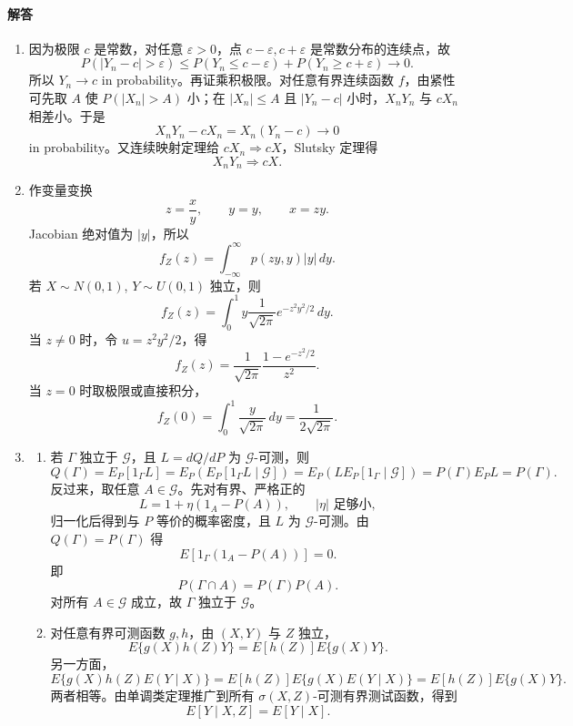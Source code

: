 \documentclass[UTF8,12pt]{ctexart}
\begin{document}
\paragraph{解答}
\begin{enumerate}[label=\textbf{\arabic*.},leftmargin=2.2em]
\item 因为极限 \(c\) 是常数，对任意 \(\varepsilon>0\)，点 \(c-\varepsilon,c+\varepsilon\) 是常数分布的连续点，故
\[
P(|Y_n-c|>\varepsilon)
\le P(Y_n\le c-\varepsilon)+P(Y_n\ge c+\varepsilon)\to0.
\]
所以 \(Y_n\to c\) in probability。再证乘积极限。对任意有界连续函数 \(f\)，由紧性可先取 \(A\) 使 \(P(|X_n|>A)\) 小；在 \(|X_n|\le A\) 且 \(|Y_n-c|\) 小时，\(X_nY_n\) 与 \(cX_n\) 相差小。于是
\[
X_nY_n-cX_n=X_n(Y_n-c)\to0
\]
in probability。又连续映射定理给 \(cX_n\Rightarrow cX\)，Slutsky 定理得
\[
X_nY_n\Rightarrow cX.
\]

\item 作变量变换
\[
z=\frac xy,\qquad y=y,\qquad x=zy.
\]
Jacobian 绝对值为 \(|y|\)，所以
\[
f_Z(z)=\int_{-\infty}^{\infty}p(zy,y)|y|\,dy.
\]
若 \(X\sim N(0,1)\), \(Y\sim U(0,1)\) 独立，则
\[
f_Z(z)=\int_0^1 y\frac1{\sqrt{2\pi}}e^{-z^2y^2/2}\,dy.
\]
当 \(z\ne0\) 时，令 \(u=z^2y^2/2\)，得
\[
f_Z(z)=\frac1{\sqrt{2\pi}}\frac{1-e^{-z^2/2}}{z^2}.
\]
当 \(z=0\) 时取极限或直接积分，
\[
f_Z(0)=\int_0^1\frac{y}{\sqrt{2\pi}}\,dy=\frac1{2\sqrt{2\pi}}.
\]

\item
\begin{enumerate}[label=\textbf{(\alph*)},leftmargin=2.4em]
\item 若 \(\Gamma\) 独立于 \(\mathcal G\)，且 \(L=dQ/dP\) 为 \(\mathcal G\)-可测，则
\[
Q(\Gamma)=E_P[1_\Gamma L]
=E_P\!\left(E_P[1_\Gamma L\mid\mathcal G]\right)
=E_P\!\left(L E_P[1_\Gamma\mid\mathcal G]\right)
=P(\Gamma)E_PL=P(\Gamma).
\]
反过来，取任意 \(A\in\mathcal G\)。先对有界、严格正的
\[
L=1+\eta(1_A-P(A)),\qquad |\eta|\text{ 足够小},
\]
归一化后得到与 \(P\) 等价的概率密度，且 \(L\) 为 \(\mathcal G\)-可测。由 \(Q(\Gamma)=P(\Gamma)\) 得
\[
E[1_\Gamma(1_A-P(A))]=0.
\]
即
\[
P(\Gamma\cap A)=P(\Gamma)P(A).
\]
对所有 \(A\in\mathcal G\) 成立，故 \(\Gamma\) 独立于 \(\mathcal G\)。
\item 对任意有界可测函数 \(g,h\)，由 \((X,Y)\) 与 \(Z\) 独立，
\[
E\{g(X)h(Z)Y\}=E\!\left[h(Z)\right]E\{g(X)Y\}.
\]
另一方面，
\[
E\{g(X)h(Z)E(Y\mid X)\}
=E\!\left[h(Z)\right]E\{g(X)E(Y\mid X)\}
=E\!\left[h(Z)\right]E\{g(X)Y\}.
\]
两者相等。由单调类定理推广到所有 \(\sigma(X,Z)\)-可测有界测试函数，得到
\[
E[Y\mid X,Z]=E[Y\mid X].
\]
\end{enumerate}


\end{enumerate}
\end{document}
